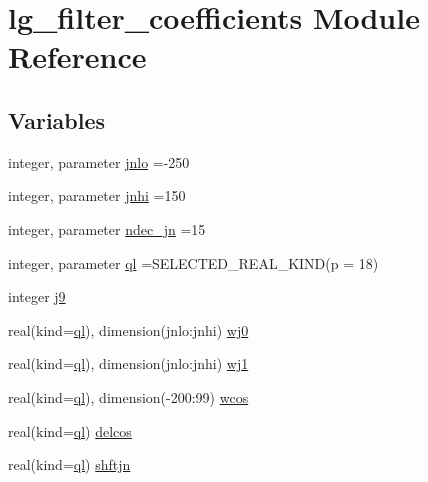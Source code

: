 \hypertarget{namespacelg__filter__coefficients}{}\section{lg\+\_\+filter\+\_\+coefficients Module Reference}
\label{namespacelg__filter__coefficients}
\subsection*{Variables}
\begin{DoxyCompactItemize}
\item 
integer, parameter \hyperlink{namespacelg__filter__coefficients_a1f3daaa8f4dc759e683d1fd1139378a6}{jnlo} =-\/250
\item 
integer, parameter \hyperlink{namespacelg__filter__coefficients_ac66b56e3000e305caa388d29b539336d}{jnhi} =150
\item 
integer, parameter \hyperlink{namespacelg__filter__coefficients_afb30e9c5cfe2ccaaa85322c4a6721a6f}{ndec\+\_\+jn} =15
\item 
integer, parameter \hyperlink{namespacelg__filter__coefficients_a6417faef3b543d16359fd03b39f7fcc5}{ql} =S\+E\+L\+E\+C\+T\+E\+D\+\_\+\+R\+E\+A\+L\+\_\+\+K\+I\+ND(p = 18)
\item 
integer \hyperlink{namespacelg__filter__coefficients_a7884e6b538d3becc2f13d5bcbc6e540b}{j9}
\item 
real(kind=\hyperlink{namespacelg__filter__coefficients_a6417faef3b543d16359fd03b39f7fcc5}{ql}), dimension(jnlo\+:jnhi) \hyperlink{namespacelg__filter__coefficients_a6118aefd8a6bfd0fedbf5530507da50f}{wj0}
\item 
real(kind=\hyperlink{namespacelg__filter__coefficients_a6417faef3b543d16359fd03b39f7fcc5}{ql}), dimension(jnlo\+:jnhi) \hyperlink{namespacelg__filter__coefficients_afbcfe820a24e8a0419832a766757189c}{wj1}
\item 
real(kind=\hyperlink{namespacelg__filter__coefficients_a6417faef3b543d16359fd03b39f7fcc5}{ql}), dimension(-\/200\+:99) \hyperlink{namespacelg__filter__coefficients_aefdd258fb993cc8ed0f37278866238ee}{wcos}
\item 
real(kind=\hyperlink{namespacelg__filter__coefficients_a6417faef3b543d16359fd03b39f7fcc5}{ql}) \hyperlink{namespacelg__filter__coefficients_a0d1c6540b355a11602f9dd08b362250f}{delcos}
\item 
real(kind=\hyperlink{namespacelg__filter__coefficients_a6417faef3b543d16359fd03b39f7fcc5}{ql}) \hyperlink{namespacelg__filter__coefficients_a70196dc988ca498d279e9e2696d5862e}{shftjn}
\end{DoxyCompactItemize}


